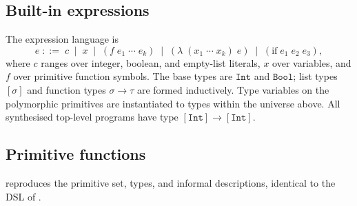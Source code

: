 \documentclass[12pt]{article}
\begin{document}
\subsection{Built-in expressions}

The expression language is
\[
  e \;::=\; c \;\mid\; x \;\mid\; (f\;e_1\;\cdots\;e_k)
         \;\mid\; (\lambda\;(x_1\;\cdots\;x_k)\;e)
         \;\mid\; (\mathrm{if}\;e_1\;e_2\;e_3),
\]
where $c$ ranges over integer, boolean, and empty-list literals, $x$ over variables, and $f$ over primitive function symbols. The base types are $\texttt{Int}$ and $\texttt{Bool}$; list types $[\sigma]$ and function types $\sigma \to \tau$ are formed inductively. Type variables on the polymorphic primitives are instantiated to types within the universe above. All synthesised top-level programs have type $[\texttt{Int}] \to [\texttt{Int}]$.

\subsection{Primitive functions}

 reproduces the primitive set, types, and informal descriptions, identical to the DSL of \citet{rule2024symbolic}.
\end{document}
